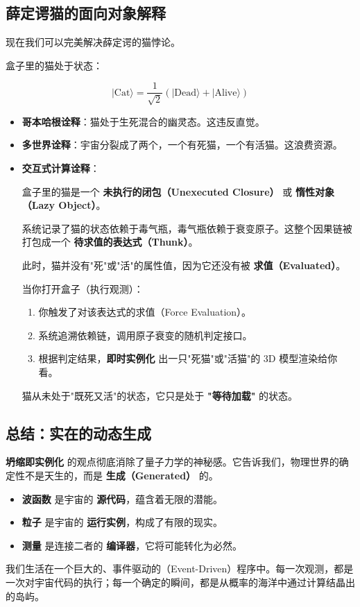 \subsection{薛定谔猫的面向对象解释}

现在我们可以完美解决薛定谔的猫悖论。

盒子里的猫处于状态：

\begin{equation}
|\text{Cat}\rangle = \frac{1}{\sqrt{2}} (|\text{Dead}\rangle + |\text{Alive}\rangle)
\end{equation}

\begin{itemize}
\item \textbf{哥本哈根诠释}：猫处于生死混合的幽灵态。这违反直觉。

\item \textbf{多世界诠释}：宇宙分裂成了两个，一个有死猫，一个有活猫。这浪费资源。

\item \textbf{交互式计算诠释}：

  盒子里的猫是一个 \textbf{未执行的闭包（Unexecuted Closure）} 或 \textbf{惰性对象（Lazy Object）}。

  系统记录了猫的状态依赖于毒气瓶，毒气瓶依赖于衰变原子。这整个因果链被打包成一个 \textbf{待求值的表达式（Thunk）}。

  此时，猫并没有"死"或"活"的属性值，因为它还没有被 \textbf{求值（Evaluated）}。

  当你打开盒子（执行观测）：

  \begin{enumerate}
  \item 你触发了对该表达式的求值（Force Evaluation）。

  \item 系统追溯依赖链，调用原子衰变的随机判定接口。

  \item 根据判定结果，\textbf{即时实例化} 出一只"死猫"或"活猫"的 3D 模型渲染给你看。
  \end{enumerate}

  猫从未处于"既死又活"的状态，它只是处于 \textbf{"等待加载"} 的状态。
\end{itemize}

\subsection{总结：实在的动态生成}

\textbf{坍缩即实例化} 的观点彻底消除了量子力学的神秘感。它告诉我们，物理世界的确定性不是天生的，而是 \textbf{生成（Generated）} 的。

\begin{itemize}
\item \textbf{波函数} 是宇宙的 \textbf{源代码}，蕴含着无限的潜能。

\item \textbf{粒子} 是宇宙的 \textbf{运行实例}，构成了有限的现实。

\item \textbf{测量} 是连接二者的 \textbf{编译器}，它将可能转化为必然。
\end{itemize}

我们生活在一个巨大的、事件驱动的（Event-Driven）程序中。每一次观测，都是一次对宇宙代码的执行；每一个确定的瞬间，都是从概率的海洋中通过计算结晶出的岛屿。
